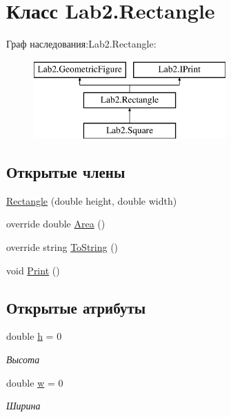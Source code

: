 \hypertarget{class_lab2_1_1_rectangle}{}\section{Класс Lab2.\+Rectangle}
\label{class_lab2_1_1_rectangle}
Граф наследования\+:Lab2.\+Rectangle\+:\begin{figure}[H]
\begin{center}
\leavevmode
\includegraphics[height=3.000000cm]{class_lab2_1_1_rectangle}
\end{center}
\end{figure}
\subsection*{Открытые члены}
\begin{DoxyCompactItemize}
\item 
\hyperlink{class_lab2_1_1_rectangle_acdb99dd549f51743792cad788e500849}{Rectangle} (double height, double width)
\item 
override double \hyperlink{class_lab2_1_1_rectangle_a3a44a2229aaec3be07a35eb6a167b100}{Area} ()
\item 
override string \hyperlink{class_lab2_1_1_rectangle_a6c03cbd28985951c1c167b51ed47cdd4}{To\+String} ()
\item 
void \hyperlink{class_lab2_1_1_rectangle_a7bc8ce3f09ba299aba57045c396b6b4e}{Print} ()
\end{DoxyCompactItemize}
\subsection*{Открытые атрибуты}
\begin{DoxyCompactItemize}
\item 
\mbox{\label{class_lab2_1_1_rectangle_a94ac15fb6583c21bf4c47bc8cf680aa2}} 
double \hyperlink{class_lab2_1_1_rectangle_a94ac15fb6583c21bf4c47bc8cf680aa2}{h} = 0
\begin{DoxyCompactList}\small\item\em Высота \end{DoxyCompactList}\item 
\mbox{\label{class_lab2_1_1_rectangle_a074656a9861271f6b4e17319b7bfc6bb}} 
double \hyperlink{class_lab2_1_1_rectangle_a074656a9861271f6b4e17319b7bfc6bb}{w} = 0
\begin{DoxyCompactList}\small\item\em Ширина \end{DoxyCompactList}\end{DoxyCompactItemize}


